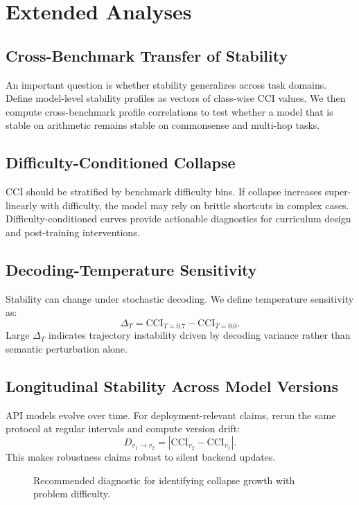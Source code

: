 \documentclass[conference]{IEEEtran}
\begin{document}
\section{Extended Analyses}
\subsection{Cross-Benchmark Transfer of Stability}
An important question is whether stability generalizes across task domains. Define model-level stability profiles as vectors of class-wise CCI values. We then compute cross-benchmark profile correlations to test whether a model that is stable on arithmetic remains stable on commonsense and multi-hop tasks.

\subsection{Difficulty-Conditioned Collapse}
CCI should be stratified by benchmark difficulty bins. If collapse increases super-linearly with difficulty, the model may rely on brittle shortcuts in complex cases. Difficulty-conditioned curves provide actionable diagnostics for curriculum design and post-training interventions.

\subsection{Decoding-Temperature Sensitivity}
Stability can change under stochastic decoding. We define temperature sensitivity as:
\begin{equation}
\Delta_T = \mathrm{CCI}_{T=0.7}-\mathrm{CCI}_{T=0.0}.
\end{equation}
Large $\Delta_T$ indicates trajectory instability driven by decoding variance rather than semantic perturbation alone.

\subsection{Longitudinal Stability Across Model Versions}
API models evolve over time. For deployment-relevant claims, rerun the same protocol at regular intervals and compute version drift:
\begin{equation}
D_{v_1\to v_2}=\left|\mathrm{CCI}_{v_2}-\mathrm{CCI}_{v_1}\right|.
\end{equation}
This makes robustness claims robust to silent backend updates.

\begin{figure}[!t]
\centering
{}
\caption{Recommended diagnostic for identifying collapse growth with problem difficulty.}
\label{fig:difficulty-cci}
\end{figure}
\end{document}
